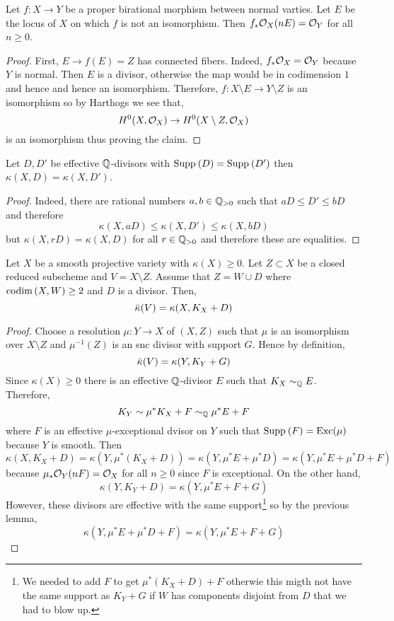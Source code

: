 \documentclass[12pt]{article}
\DeclareMathOperator{\Exc}{\mathrm{Exc}}
\begin{document}
\begin{lemma}
Let $f : X \to Y$ be a proper birational morphism between normal varties. Let $E$ be the locus of $X$ on which $f$ is not an isomorphism. Then $f_* \mathcal{O}_{X}(n E) = \mathcal{O}_{Y}$ for all $n \ge 0$. 
\end{lemma}

\begin{proof}
First, $E \to f(E) = Z$ has connected fibers. Indeed, $f_* \mathcal{O}_{X} = \mathcal{O}_{Y}$ because $Y$ is normal. Then $E$ is a divisor, otherwise the map would be \etale in codimension $1$ and hence \etale and hence an isomorphism. Therefore, $f : X \setminus E \to Y \setminus Z$ is an isomorphism so by Harthogs we see that,
\[ H^0(X, \mathcal{O}_{X}) \to H^0(X \setminus Z, \mathcal{O}_{X}) \]
is an isomorphism thus proving the claim.
\end{proof}

\begin{lemma}
Let $D, D'$ be effective $\mathbb{Q}$-divisors with $\mathrm{Supp}_{}\left(D \right) = \mathrm{Supp}_{}\left(D' \right)$ then $\kappa(X, D) = \kappa(X, D')$. 
\end{lemma}

\begin{proof}
Indeed, there are rational numbers $a,b \in \mathbb{Q}_{>0}$ such that $a D \le D' \le b D$ and therefore
\[ \kappa(X, a D) \le \kappa(X, D') \le \kappa(X, b D) \]
but $\kappa(X, r D) = \kappa(X, D)$ for all $r \in \mathbb{Q}_{>0}$ and therefore these are equalities. 
\end{proof}

\begin{lemma}
Let $X$ be a smooth projective variety with $\kappa(X) \ge 0$. Let $Z \subset X$ be a closed reduced subscheme and $V = X \setminus Z$. Assume that $Z = W \cup D$ where $\mathrm{codim}\left( X, W \right) \ge 2$ and $D$ is a divisor. Then,
\[ \bar{\kappa}(V) = \kappa(X, K_X + D) \]
\end{lemma}

\begin{proof}
Choose a resolution $\mu : Y \to X$ of $(X, Z)$ such that $\mu$ is an isomorphism over $X \setminus Z$ and $\mu^{-1}(Z)$ is an snc divisor with support $G$. Hence by definition,
\[ \bar{\kappa}(V) = \kappa(Y, K_Y + G) \]
Since $\kappa(X) \ge 0$ there is an effective $\mathbb{Q}$-divisor $E$ such that $K_X \sim_{\mathbb{Q}} E$. Therefore,
\[ K_Y \sim \mu^* K_X + F \sim_{\mathbb{Q}} \mu^* E + F \]
where $F$ is an effective $\mu$-exceptional dvisor on $Y$ such that $\Supp{}{F} = \Exc(\mu)$ because $Y$ is smooth. Then
\[ \kappa(X, K_X + D) = \kappa(Y, \mu^* (K_X + D)) = \kappa(Y, \mu^* E + \mu^* D) = \kappa(Y, \mu^* E + \mu^* D + F) \]
because $\mu_* \mathcal{O}_{Y}(n F) = \mathcal{O}_{X}$ for all $n \ge 0$ since $F$ is exceptional. On the other hand,
\[ \kappa(Y, K_Y + D) = \kappa(Y, \mu^* E + F + G) \]
However, these divisors are effective with the same support\footnote{We needed to add $F$ to get $\mu^* (K_X + D) + F$ otherwie this migth not have the same support as $K_Y + G$ if $W$ has components disjoint from $D$ that we had to blow up.} so by the previous lemma,
\[ \kappa(Y, \mu^* E + \mu^*D + F) = \kappa(Y, \mu^* E + F + G) \]
\end{proof}
\end{document}
